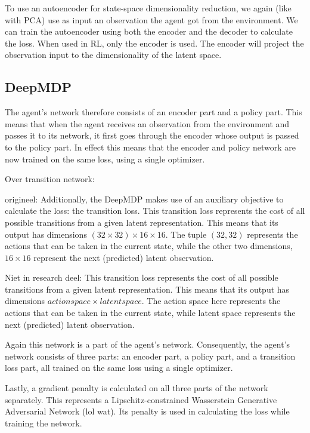 To use an autoencoder for state-space dimensionality reduction, we again (like with PCA) use as input an observation the agent got from the environment. We can train the autoencoder using both the encoder and the decoder to calculate the loss. When used in RL, only the encoder is used. The encoder will project the observation input to the dimensionality of the latent space. 

\subsection{DeepMDP}\label{pl-deepmdp}
 The agent's network therefore consists of an encoder part and a policy part. This means that when the agent receives an observation from the environment and passes it to its network, it first goes through the encoder whose output is passed to the policy part. In effect this means that the encoder and policy network are now trained on the same loss, using a single optimizer.
 
Over transition network:

origineel: Additionally, the DeepMDP makes use of an auxiliary objective to calculate the loss: the transition loss. This transition loss represents the cost of all possible transitions from a given latent representation. This means that its output has dimensions $(32 \times 32) \times 16 \times 16$. The tuple $(32, 32)$ represents the actions that can be taken in the current state, while the other two dimensions, $16 \times 16$ represent the next (predicted) latent observation.

Niet in research deel: This transition loss represents the cost of all possible transitions from a given latent representation. This means that its output has dimensions $action space \times latent space$. The action space here represents the actions that can be taken in the current state, while latent space represents the next (predicted) latent observation.

Again this network is a part of the agent's network. Consequently, the agent's network consists of three parts: an encoder part, a policy part, and a transition loss part, all trained on the same loss using a single optimizer.

Lastly, a gradient penalty is calculated on all three parts of the network separately. This represents a Lipschitz-constrained Wasserstein Generative Adversarial Network (lol wat). Its penalty is used in calculating the loss while training the network. 
